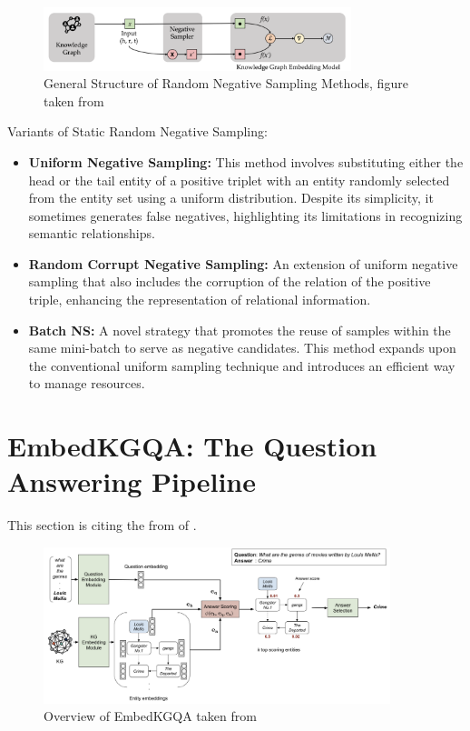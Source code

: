 \documentclass[12pt]{article}
\begin{document}
\begin{figure}[!ht] %
  \centering %
  \includegraphics[width=0.8\textwidth]{NS.png} %
  \caption{General Structure of Random Negative Sampling Methods, figure taken from \textcite{madushanka2024negative}} %
  \label{fig:NS} %
\end{figure}

Variants of Static Random Negative Sampling: 
\begin{itemize}
    \item \textbf{Uniform Negative Sampling:} This method involves substituting either the head or the tail entity of a positive triplet with an entity randomly selected from the entity set using a uniform distribution. Despite its simplicity, it sometimes generates false negatives, highlighting its limitations in recognizing semantic relationships.
    \item \textbf{Random Corrupt Negative Sampling:} An extension of uniform negative sampling that also includes the corruption of the relation of the positive triple, enhancing the representation of relational information.
    \item \textbf{Batch NS:} A novel strategy that promotes the reuse of samples within the same mini-batch to serve as negative candidates. This method expands upon the conventional uniform sampling technique and introduces an efficient way to manage resources.
\end{itemize}


\section{EmbedKGQA: The Question Answering Pipeline}

This section is citing the from of \textcite{saxena-etal-2020-improving}.

\begin{figure}[!ht] %
  \centering %
  \includegraphics[width=0.9\textwidth]{EmbedKGQA.png} %
  \caption{Overview of EmbedKGQA taken from \textcite{saxena-etal-2020-improving}} %
  \label{fig:EmbedKGQA} %
\end{figure}
\end{document}
